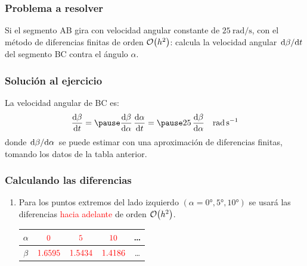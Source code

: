 \documentclass[12pt]{beamer}
\begin{document}
\begin{frame}
\frametitle{Problema a resolver}
Si el segmento AB gira con velocidad angular constante de $\SI{25}{\radian\per\second}$, \pause con el método de diferencias finitas de orden $\order{h^{2}}$: calcula la \textcolor{ao}{velocidad angular} $\dv*{\beta}{t}$ del segmento BC contra el ángulo $\alpha$.
\end{frame}
\begin{frame}
\frametitle{Solución al ejercicio}
La velocidad angular de BC es:
\pause
\begin{eqnarray*}
\dv{\beta}{t} = \pause \dv{\beta}{\alpha} \, \dv{\alpha}{t} = \pause 25 \, \dv{\beta}{\alpha} \quad \SI{}{\radian\per\second}
\end{eqnarray*}
donde $\dv*{\beta}{\alpha}$ se puede estimar con una aproximación de diferencias finitas, tomando los datos de la tabla anterior.
\end{frame}
\begin{frame}
\frametitle{Calculando las diferencias}
\begin{enumerate}
\item Para los puntos extremos del lado izquierdo $(\alpha = \ang{0}, \ang{5}, \ang{10})$ se usará las diferencias \textcolor{red}{hacia adelante} de orden $\order{h^{2}}$.
\\[1em]
\begin{table}
\centering
\fontsize{10}{10}\selectfont
\begin{tabular}{c | c | c | c | c}
$\alpha$ & $\color{red}{0}$ & $\color{red}{5}$ & $\color{red}{10}$ & \ldots \\ \hline
$\beta$ & $\color{red}{1.6595}$ & $\color{red}{1.5434}$ & $\color{red}{1.4186}$ & \ldots 
\end{tabular}
\end{table}
\seti
\end{enumerate}
\end{frame}
\end{document}
